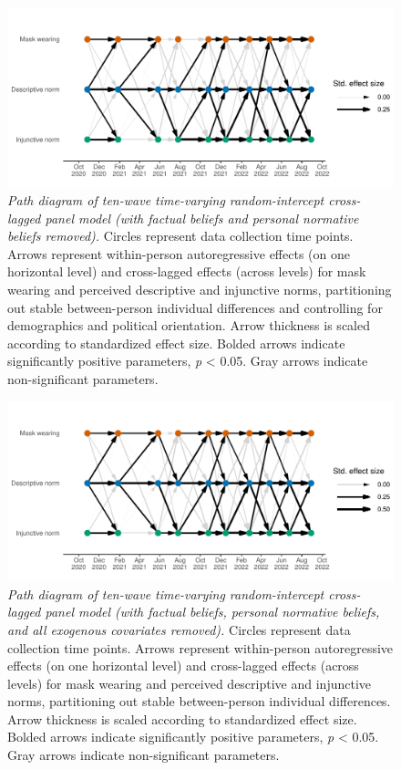 \documentclass[
  man, donotrepeattitle,floatsintext]{apa6}
\begin{document}
\newpage



\begin{figure}
\centering
\includegraphics{manuscript_files/figure-latex/plotRICLPMPath2-1.pdf}
\caption{\label{fig:plotRICLPMPath2}\emph{Path diagram of ten-wave time-varying random-intercept cross-lagged panel model (with factual beliefs and personal normative beliefs removed).} Circles represent data collection time points. Arrows represent within-person autoregressive effects (on one horizontal level) and cross-lagged effects (across levels) for mask wearing and perceived descriptive and injunctive norms, partitioning out stable between-person individual differences and controlling for demographics and political orientation. Arrow thickness is scaled according to standardized effect size. Bolded arrows indicate significantly positive parameters, \emph{p} \textless{} 0.05. Gray arrows indicate non-significant parameters.}
\end{figure}

\newpage



\begin{figure}
\centering
\includegraphics{manuscript_files/figure-latex/plotRICLPMPath3-1.pdf}
\caption{\label{fig:plotRICLPMPath3}\emph{Path diagram of ten-wave time-varying random-intercept cross-lagged panel model (with factual beliefs, personal normative beliefs, and all exogenous covariates removed).} Circles represent data collection time points. Arrows represent within-person autoregressive effects (on one horizontal level) and cross-lagged effects (across levels) for mask wearing and perceived descriptive and injunctive norms, partitioning out stable between-person individual differences. Arrow thickness is scaled according to standardized effect size. Bolded arrows indicate significantly positive parameters, \emph{p} \textless{} 0.05. Gray arrows indicate non-significant parameters.}
\end{figure}
\end{document}
